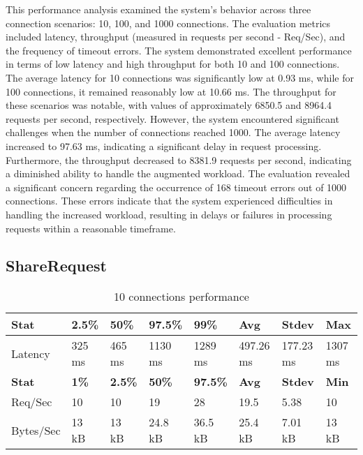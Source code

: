 \documentclass[../Main.tex]{subfiles}
\begin{document}
This performance analysis examined the system's behavior across three connection scenarios: 10, 100, and 1000 connections. The evaluation metrics included latency, throughput (measured in requests per second - Req/Sec), and the frequency of timeout errors.
The system demonstrated excellent performance in terms of low latency and high throughput for both 10 and 100 connections. The average latency for 10 connections was significantly low at 0.93 ms, while for 100 connections, it remained reasonably low at 10.66 ms. The throughput for these scenarios was notable, with values of approximately 6850.5 and 8964.4 requests per second, respectively.
However, the system encountered significant challenges when the number of connections reached 1000. The average latency increased to 97.63 ms, indicating a significant delay in request processing. Furthermore, the throughput decreased to 8381.9 requests per second, indicating a diminished ability to handle the augmented workload.
The evaluation revealed a significant concern regarding the occurrence of 168 timeout errors out of 1000 connections. These errors indicate that the system experienced difficulties in handling the increased workload, resulting in delays or failures in processing requests within a reasonable timeframe.

\begin{table}[H]
\subsection{ShareRequest}
  \centering
\begin{tabular}{|l|l|l|l|l|l|l|l|}
\hline
\rowcolor[HTML]{f56b00}
\textbf{Stat} & \textbf{2.5\%} & \textbf{50\%} & \textbf{97.5\%} & \textbf{99\%} & \textbf{Avg} & \textbf{Stdev} & \textbf{Max} \\
\hline
Latency   & 325 ms & 465 ms & 1130 ms & 1289 ms & 497.26 ms & 177.23 ms & 1307 ms \\
\hline
\rowcolor[HTML]{f56b00}
\textbf{Stat} & \textbf{1\%} & \textbf{2.5\%} & \textbf{50\%} & \textbf{97.5\%} & \textbf{Avg} & \textbf{Stdev} & \textbf{Min} \\
Req/Sec   & 10  & 10  & 19   & 28   & 19.5  & 5.38 & 10  \\
\hline
Bytes/Sec & 13 kB & 13 kB & 24.8 kB & 36.5 kB & 25.4 kB & 7.01 kB & 13 kB \\
\hline
\end{tabular}
 \caption{10 connections performance}
 \label{10-connections-performance}
\end{table}
\end{document}
